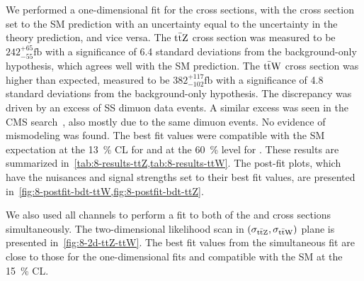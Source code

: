 We performed a one-dimensional fit for the \ttW cross sections, with the \ttZ
cross section set to the SM prediction with an uncertainty equal to the
uncertainty in the theory prediction, and vice versa. The $\text{t}\bar{\text{t}}\text{Z}$ cross section
was measured to be $242^{+65}_{-55}\text{fb}$ with a significance of 6.4 standard
deviations from the background-only hypothesis, which agrees well with the SM
prediction. The $\text{t}\bar{\text{t}}\text{W}$ cross section was higher than expected, measured to be
$382^{+117}_{-102}\text{fb}$ with a significance of 4.8 standard deviations from
the background-only hypothesis. The discrepancy was driven by an excess of SS
dimuon data events. A similar excess was seen in the CMS \ttH
search~\cite{Khachatryan2014ttH}, also mostly due to the same dimuon events. No
evidence of mismodeling was found. The best fit values were compatible with the
SM expectation at the \SI{13}{\percent} CL for \ttW and at the \SI{60}{\percent}
level for \ttZ. These results are summarized
in~\cref{tab:8-results-ttZ,tab:8-results-ttW}. The post-fit plots, which have
the nuisances and signal strengths set to their best fit values, are presented
in~\cref{fig:8-postfit-bdt-ttW,fig:8-postfit-bdt-ttZ}.

We also used all channels to perform a fit to both of the \ttW and \ttZ cross
sections simultaneously. The two-dimensional likelihood scan in $(\sigma_{\text{t}\bar{\text{t}}\text{Z}},
\sigma_{\text{t}\bar{\text{t}}\text{W}})$ plane is presented in~\cref{fig:8-2d-ttZ-ttW}. The best fit
values from the simultaneous fit are close to those for the one-dimensional fits
and compatible with the SM at the \SI{15}{\percent} CL.

\begin{table}
  
\end{table}
\begin{landscape}
  \begin{table}
  \vspace{-2cm}
    
  \end{table}
\end{landscape}
\begin{landscape}
  \begin{table}
  \vspace{-2cm}
    
  \end{table}
\end{landscape}

